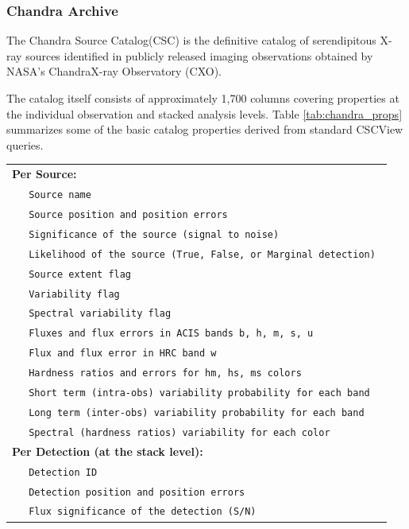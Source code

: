 \documentclass[11pt,a4paper]{ivoa}
\begin{document}
\subsubsection{Chandra Archive}
The Chandra Source Catalog(CSC) is the definitive catalog of serendipitous X-ray sources identified in
publicly released imaging observations obtained by NASA’s ChandraX-ray Observatory (CXO).

The catalog itself consists of approximately 1,700 columns covering properties at the 
individual observation and stacked analysis levels.
Table \ref{tab:chandra_props} summarizes some of the basic catalog properties derived
from standard CSCView queries.

\begin{table}[ht!]
  \tiny
  \begin{tabular}{|p{0.4cm}p{10.0cm}|}
    \hline
    \multicolumn{2}{|l|}{\textbf{Per Source:}} \\
    & \texttt{ Source name } \\
    & \texttt{ Source position and position errors } \\
    & \texttt{ Significance of the source (signal to noise) } \\
    & \texttt{ Likelihood of the source  (True, False, or Marginal detection) } \\
    & \texttt{ Source extent flag } \\
    & \texttt{ Variability flag } \\
    & \texttt{ Spectral variability flag } \\
    & \texttt{ Fluxes and flux errors in ACIS bands b, h, m, s, u } \\
    & \texttt{ Flux and flux error in  HRC band w } \\
    & \texttt{ Hardness ratios and errors for hm, hs, ms colors } \\
    & \texttt{ Short term (intra-obs) variability probability for each band } \\
    & \texttt{ Long term (inter-obs) variability probability for each band } \\
    & \texttt{ Spectral (hardness ratios) variability for each color } \\
    \hline
    \multicolumn{2}{|l|}{\textbf{Per Detection (at the stack level):}} \\
    & \texttt{ Detection ID } \\
    & \texttt{ Detection position and position errors } \\
    & \texttt{ Flux significance of the detection (S/N) } \\

\end{tabular}
\end{table}
\end{document}
